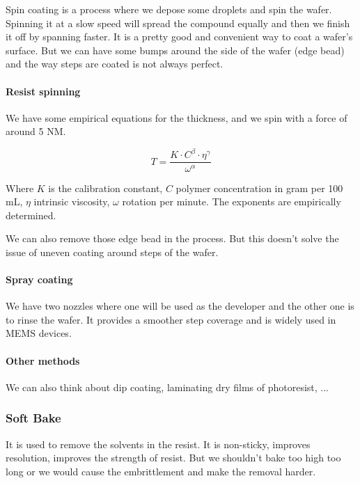 \documentclass[
]{article}
\begin{document}
Spin coating is a process where we depose some droplets and spin the
wafer. Spinning it at a slow speed will spread the compound equally and
then we finish it off by spanning faster. It is a pretty good and
convenient way to coat a wafer's surface. But we can have some bumps
around the side of the wafer (edge bead) and the way steps are coated is
not always perfect.

\hypertarget{resist-spinning}{%
\paragraph{Resist spinning}\label{resist-spinning}}

We have some empirical equations for the thickness, and we spin with a
force of around 5 NM.

\[T = \frac{K \cdot C^\beta \cdot \eta^\gamma}{\omega^\alpha}\]

Where \(K\) is the calibration constant, \(C\) polymer concentration in
gram per 100 mL, \(\eta\) intrinsic viscosity, \(\omega\) rotation per
minute. The exponents are empirically determined.

We can also remove those edge bead in the process. But this doesn't
solve the issue of uneven coating around steps of the wafer.

\hypertarget{spray-coating}{%
\paragraph{Spray coating}\label{spray-coating}}

We have two nozzles where one will be used as the developer and the
other one is to rinse the wafer. It provides a smoother step coverage
and is widely used in MEMS devices.

\hypertarget{other-methods}{%
\paragraph{Other methods}\label{other-methods}}

We can also think about dip coating, laminating dry films of
photoresist, ...

\hypertarget{soft-bake}{%
\subsubsection{Soft Bake}\label{soft-bake}}

It is used to remove the solvents in the resist. It is non-sticky,
improves resolution, improves the strength of resist. But we shouldn't
bake too high too long or we would cause the embrittlement and make the
removal harder.
\end{document}
